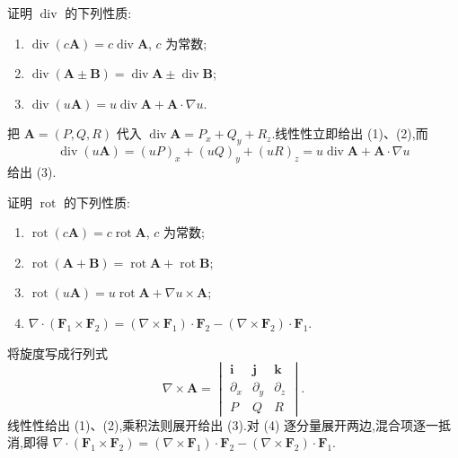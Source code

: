 \begin{example}
    证明 $\operatorname{div}$ 的下列性质:
    \begin{enumerate}
        \item $\operatorname{div}(c\bm A)=c\operatorname{div}\bm A$, $c$ 为常数;
        \item $\operatorname{div}(\bm A\pm\bm B)=\operatorname{div}\bm A\pm\operatorname{div}\bm B$;
        \item $\operatorname{div}(u\bm A)=u\operatorname{div}\bm A+\bm A\cdot\nabla u$.
    \end{enumerate}
\end{example}
\exampleblank

\begin{solution}
    把 $\bm A=(P,Q,R)$ 代入 $\operatorname{div}\bm A=P_x+Q_y+R_z$.线性性立即给出 (1)、(2),而
    \[
        \operatorname{div}(u\bm A)=(uP)_x+(uQ)_y+(uR)_z
        =u\operatorname{div}\bm A+\bm A\cdot\nabla u
    \]
    给出 (3).
\end{solution}

\begin{example}
    证明 $\operatorname{rot}$ 的下列性质:
    \begin{enumerate}
        \item $\operatorname{rot}(c\bm A)=c\operatorname{rot}\bm A$, $c$ 为常数;
        \item $\operatorname{rot}(\bm A+\bm B)=\operatorname{rot}\bm A+\operatorname{rot}\bm B$;
        \item $\operatorname{rot}(u\bm A)=u\operatorname{rot}\bm A+\nabla u\times\bm A$;
        \item $\nabla\cdot(\bm F_1\times\bm F_2)=(\nabla\times\bm F_1)\cdot\bm F_2-(\nabla\times\bm F_2)\cdot\bm F_1$.
    \end{enumerate}
\end{example}
\exampleblank

\begin{solution}
    将旋度写成行列式
    \[
        \nabla\times\bm A=
        \begin{vmatrix}\bm i      & \bm j      & \bm k      \\
               \partial_x & \partial_y & \partial_z \\P&Q&R\end{vmatrix}.
    \]
    线性性给出 (1)、(2),乘积法则展开给出 (3).对 (4) 逐分量展开两边,混合项逐一抵消,即得
    $\nabla\cdot(\bm F_1\times\bm F_2)=(\nabla\times\bm F_1)\cdot\bm F_2-(\nabla\times\bm F_2)\cdot\bm F_1$.
\end{solution}

